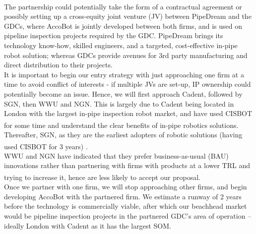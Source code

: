 \documentclass[11pt]{article}		%
\newcommand{\supercite}[1]{\textsuperscript{\cite{#1}}}		%
\begin{document}
        \\ 
	    \hspace*{3ex}The partnership could potentially take the form of a contractual agreement or possibly setting up a cross-equity joint venture (JV) between PipeDream and the GDCs, where AccoBot is jointly developed between both firms, and is used on pipeline inspection projects required by the GDC. PipeDream brings its technology know-how, skilled engineers, and a targeted, cost-effective in-pipe robot solution; whereas GDCs provide avenues for 3rd party manufacturing and direct distribution to their projects. 
        \\
        \hspace*{3ex}It is important to begin our entry strategy with just approaching one firm at a time to avoid conflict of interests - if multiple JVs are set-up, IP ownership could potentially become an issue. Hence, we will first approach Cadent, followed by SGN, then WWU and NGN. This is largely due to Cadent being located in London with the largest in-pipe inspection robot market, and have used CISBOT for some time and understand the clear benefits of in-pipe robotics solutions\supercite{cadentbot}. Thereafter, SGN, as they are the earliest adopters of robotic solutions (having used CISBOT for 3 years)\supercite{SGNbot} .
        \\
        \hspace*{3ex}WWU and NGN have indicated that they prefer business-as-usual (BAU) innovations rather than partnering with firms with products at a lower TRL and trying to increase it\supercite{WWUbot}\supercite{NGNbot}, hence are less likely to accept our proposal. 
        \\
        \hspace*{3ex}Once we partner with one firm, we will stop approaching other firms, and begin developing AccoBot with the partnered firm. We estimate a runway of 2 years  before the technology is commercially viable, after which our beachhead market would be pipeline inspection projects in the partnered GDC’s area of operation – ideally London with Cadent as it has the largest SOM. 
    
\end{document}
